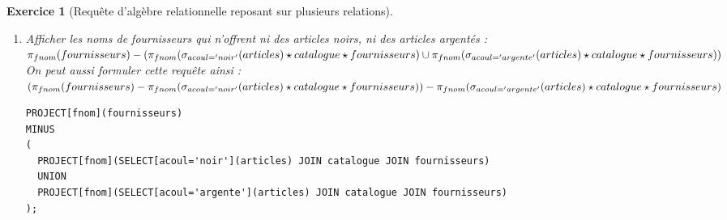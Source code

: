 \documentclass{article}
\theoremstyle{exostyle}
\newtheorem{exercice}{Exercice}
\newenvironment{questions}{

\begin{enumerate}[\hspace{12pt}\bfseries\itshape 1.]}{
\end{enumerate}

} %
\begin{document}
\begin{exercice}[Requête d'algèbre relationnelle reposant sur plusieurs relations]
\begin{questions}
\item Afficher les noms de fournisseurs qui n'offrent ni des articles noirs, ni des articles argentés :\\
  $\pi_{fnom}(fournisseurs) - (\pi_{fnom}(\sigma_{acoul='noir'}(articles) \star catalogue \star fournisseurs)\newline \cup \pi_{fnom}(\sigma_{acoul='argente'}(articles) \star catalogue \star fournisseurs))$\\
On peut aussi formuler cette requête ainsi :\\
  $(\pi_{fnom}(fournisseurs) - \pi_{fnom}(\sigma_{acoul='noir'}(articles) \star catalogue \star fournisseurs) )\newline - \pi_{fnom}(\sigma_{acoul='argente'}(articles) \star catalogue \star fournisseurs)$\\


\begin{verbatim}
PROJECT[fnom](fournisseurs)
MINUS
(
  PROJECT[fnom](SELECT[acoul='noir'](articles) JOIN catalogue JOIN fournisseurs)
  UNION
  PROJECT[fnom](SELECT[acoul='argente'](articles) JOIN catalogue JOIN fournisseurs)
);
\end{verbatim}

\end{questions}

\end{exercice}
\end{document}
